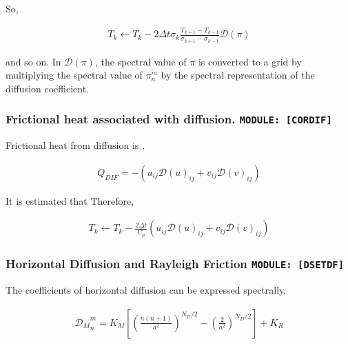 So,

\begin{eqnarray}
  T_k \leftarrow  T_k 
       -  2 \Delta t
        \sigma_{k} \frac{T_{k+1}-T_{k-1}}{\sigma_{k+1} - \sigma_{k-1}}
        {\mathcal D}(\pi)
\end{eqnarray}

and so on. In \({\mathcal D}(\pi)\), the spectral value of \(\pi\) is
converted to a grid by multiplying the spectral value of \(\pi_n^m\) by
the spectral representation of the diffusion coefficient.

\hypertarget{frictional-heat-associated-with-diffusion.-module-cordif}{%
\subsubsection{\texorpdfstring{Frictional heat associated with
diffusion.
\texttt{MODULE:\ {[}CORDIF{]}}}{Frictional heat associated with diffusion. MODULE: {[}CORDIF{]}}}\label{frictional-heat-associated-with-diffusion.-module-cordif}}

Frictional heat from diffusion is ,

\begin{eqnarray}
  Q_{DIF} = - \left( u_{ij} {\mathcal D}(u)_{ij}
                   + v_{ij} {\mathcal D}(v)_{ij} \right)
\end{eqnarray}

It is estimated that Therefore,

\begin{eqnarray}
  T_k \leftarrow  T_k
       -  \frac{2 \Delta t}{C_p}
           \left( u_{ij} {\mathcal D}(u)_{ij}
                 + v_{ij} {\mathcal D}(v)_{ij} \right)
\end{eqnarray}

\hypertarget{horizontal-diffusion-and-rayleigh-friction-module-dsetdf}{%
\subsubsection{\texorpdfstring{Horizontal Diffusion and Rayleigh
Friction
\texttt{MODULE:\ {[}DSETDF{]}}}{Horizontal Diffusion and Rayleigh Friction MODULE: {[}DSETDF{]}}}\label{horizontal-diffusion-and-rayleigh-friction-module-dsetdf}}

The coefficients of horizontal diffusion can be expressed spectrally,

\begin{eqnarray}
 {{\mathcal D}_M}_n^m = K_M
                      \left[ \left( \frac{n(n+1)}{a^2} \right)^{N_D/2}
                                - \left( \frac{2}{a^2} \right)^{N_D/2}
                      \right]
                  + K_R
\end{eqnarray}

